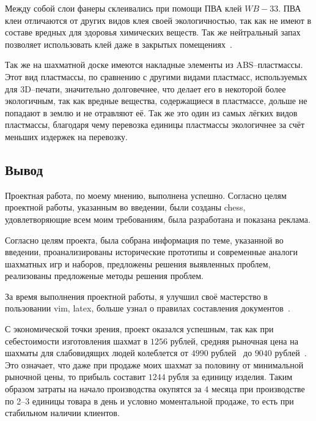 Между собой слои фанеры склеивались при помощи ПВА клей $WB-33$. ПВА клеи
отличаются от других видов клея своей экологичностью, так как не имеют в
составе вредных для здоровья химических веществ. Так же нейтральный запах
позволяет использовать клей даже в закрытых помещениях~\cite{web:kleysnab}.

Так же на шахматной доске имеются накладные элементы из ABS--пласт\-мас\-сы. Этот
вид пластмассы, по сравнению с другими видами пластмасс, используемых для
3D--печати, значительно долговечнее, что делает его  в некоторой более
экологичным, так как вредные вещества, содержащиеся в пластмассе, дольше не
попадают в землю и не отравляют её. Так же это один из самых лёгких видов
пластмассы, благодаря чему перевозка единицы пластмассы экологичнее за счёт
меньших издержек на перевозку.

\subsection{Вывод}
Проектная работа, по моему мнению, выполнена успешно. Согласно
целям проектной работы, указанным во введении, были созданы \gls{chess},
удовлетворяющие всем моим требованиям, была разработана и показана реклама.

Согласно целям проекта, была собрана информация по теме, указанной во
введении, проанализированы исторические прототипы и современные аналоги
шахматных игр и наборов, предложены решения выявленных проблем, реализованы
предложеные методы решения проблем.

За время выполнения проектной работы, я улучшил своё мастерство в пользовании
\Gls{vim}, \gls{latex}, больше узнал о правилах составления
документов~\cite{web:docs, web:udc}.

С  экономической точки зрения, проект оказался успешным, так как при
себестоимости изготовления шахмат в $1256$ рублей, средняя рыночная цена на
шахматы для слабовидящих людей колеблется от $4990$
рублей~\cite{web:blind-chess-price-min} до $9040$
рублей~\cite{web:blind-chess-price-max}. Это означает, что даже при продаже
моих шахмат за половину от минимальной рыночной цены, то прибыль составит
$1244$ рубля за единицу изделия. Таким образом затраты на начало производства
окупятся за $4$ месяца при производстве по 2--3 единицы товара в день и условно
моментальной продаже, то есть при стабильном наличии клиентов.

